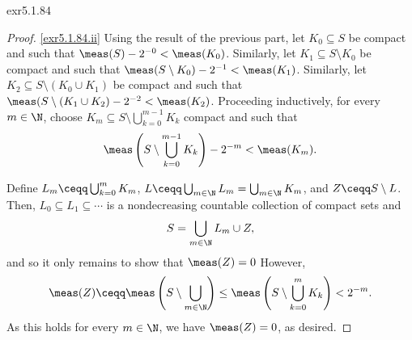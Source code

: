 \begin{prp}{}{exr5.1.84}
\begin{proof}
\blankline
\noindent
\cref{exr5.1.84.ii} Using the result of the previous part, let $K_0\subseteq S$ be compact and such that $\meas (S)-2^{-0}<\meas (K_0)$.  Similarly, let $K_1\subseteq S\setminus K_0$ be compact and such that $\meas (S\setminus K_0)-2^{-1}<\meas (K_1)$.  Similarly, let $K_2\subseteq S\setminus (K_0\cup K_1)$ be compact and such that $\meas (S\setminus (K_1\cup K_2)-2^{-2}<\meas (K_2)$.  Proceeding inductively, for every $m\in \N$, choose $K_m\subseteq S\setminus \bigcup _{k=0}^{m-1}K_k$ compact and such that
\begin{equation}
\meas \left( S\setminus \bigcup_{k=0}^{m-1}K_k\right) -2^{-m}<\meas (K_m).
\end{equation}

Define $L_m\ceqq \bigcup _{k=0}^mK_m$, $L\ceqq \bigcup _{m\in \N}L_m=\bigcup _{m\in \N}K_m$, and $Z\ceqq S\setminus L$.  Then, $L_0\subseteq L_1\subseteq \cdots$ is a nondecreasing countable collection of compact sets and
\begin{equation}
S=\bigcup _{m\in \N}L_m\cup Z,
\end{equation}
and so it only remains to show that $\meas (Z)=0$  However,
\begin{equation}
\meas (Z)\ceqq \meas \left( S\setminus \bigcup _{m\in \N}\right) \leq \meas \left( S\setminus \bigcup _{k=0}^mK_k\right) <2^{-m}.
\end{equation}
As this holds for every $m\in \N$, we have $\meas (Z)=0$, as desired.
\end{proof}
\end{prp}

